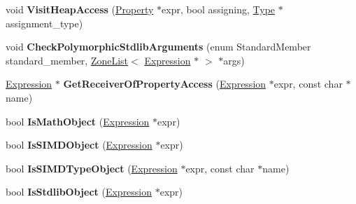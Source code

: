 \begin{DoxyCompactItemize}
\item 
void {\bfseries Visit\+Heap\+Access} (\hyperlink{classv8_1_1internal_1_1_property}{Property} $\ast$expr, bool assigning, \hyperlink{classv8_1_1internal_1_1_type}{Type} $\ast$assignment\+\_\+type)\hypertarget{classv8_1_1internal_1_1_asm_typer_a8df4da9034f0fc49c874f958a646805c}{}\label{classv8_1_1internal_1_1_asm_typer_a8df4da9034f0fc49c874f958a646805c}

\item 
void {\bfseries Check\+Polymorphic\+Stdlib\+Arguments} (enum Standard\+Member standard\+\_\+member, \hyperlink{classv8_1_1internal_1_1_zone_list}{Zone\+List}$<$ \hyperlink{classv8_1_1internal_1_1_expression}{Expression} $\ast$ $>$ $\ast$args)\hypertarget{classv8_1_1internal_1_1_asm_typer_ade46bcc183e15dd2375bf1653c196f21}{}\label{classv8_1_1internal_1_1_asm_typer_ade46bcc183e15dd2375bf1653c196f21}

\item 
\hyperlink{classv8_1_1internal_1_1_expression}{Expression} $\ast$ {\bfseries Get\+Receiver\+Of\+Property\+Access} (\hyperlink{classv8_1_1internal_1_1_expression}{Expression} $\ast$expr, const char $\ast$name)\hypertarget{classv8_1_1internal_1_1_asm_typer_aa1a0226ab1d34ce5652b948e1272a4fb}{}\label{classv8_1_1internal_1_1_asm_typer_aa1a0226ab1d34ce5652b948e1272a4fb}

\item 
bool {\bfseries Is\+Math\+Object} (\hyperlink{classv8_1_1internal_1_1_expression}{Expression} $\ast$expr)\hypertarget{classv8_1_1internal_1_1_asm_typer_a2ba0a81b63da0bdb1e51205548388a5f}{}\label{classv8_1_1internal_1_1_asm_typer_a2ba0a81b63da0bdb1e51205548388a5f}

\item 
bool {\bfseries Is\+S\+I\+M\+D\+Object} (\hyperlink{classv8_1_1internal_1_1_expression}{Expression} $\ast$expr)\hypertarget{classv8_1_1internal_1_1_asm_typer_ab303f635825d45bd6c863cc98e15063a}{}\label{classv8_1_1internal_1_1_asm_typer_ab303f635825d45bd6c863cc98e15063a}

\item 
bool {\bfseries Is\+S\+I\+M\+D\+Type\+Object} (\hyperlink{classv8_1_1internal_1_1_expression}{Expression} $\ast$expr, const char $\ast$name)\hypertarget{classv8_1_1internal_1_1_asm_typer_a4763333abbb54435797a227755cb5a11}{}\label{classv8_1_1internal_1_1_asm_typer_a4763333abbb54435797a227755cb5a11}

\item 
bool {\bfseries Is\+Stdlib\+Object} (\hyperlink{classv8_1_1internal_1_1_expression}{Expression} $\ast$expr)\hypertarget{classv8_1_1internal_1_1_asm_typer_a9da09ed1ba7f8bfe9b2cc43dfc80749a}{}\label{classv8_1_1internal_1_1_asm_typer_a9da09ed1ba7f8bfe9b2cc43dfc80749a}


\end{DoxyCompactItemize}
